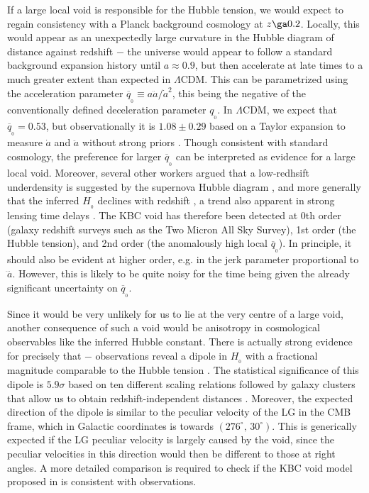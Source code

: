 \documentclass[fleqn,usenatbib,useAMS]{mnras} %
\begin{document}
If a large local void is responsible for the Hubble tension, we would expect to regain consistency with a Planck background cosmology at $z \ga 0.2$. Locally, this would appear as an unexpectedly large curvature in the Hubble diagram of distance against redshift $-$ the universe would appear to follow a standard background expansion history until $a \approx 0.9$, but then accelerate at late times to a much greater extent than expected in $\Lambda$CDM. This can be parametrized using the acceleration parameter $\overline{q}_{_0} \equiv a \ddot{a}/{\dot{a}}^2$, this being the negative of the conventionally defined deceleration parameter $q_{_0}$. In $\Lambda$CDM, we expect that $\overline{q}_{_0} = 0.53$, but observationally it is $1.08 \pm 0.29$ based on a Taylor expansion to measure $\dot{a}$ and $\ddot{a}$ without strong priors \citep{Camarena_2020a, Camarena_2020b}. Though consistent with standard cosmology, the preference for larger $\overline{q}_{_0}$ can be interpreted as evidence for a large local void. Moreover, several other workers argued that a low-redhsift underdensity is suggested by the supernova Hubble diagram \citep{Colgain_2019, Lukovic_2020, Kazantzidis_2020, Castello_2021, Kazantzidis_2021}, and more generally that the inferred $H_{_0}$ declines with redshift \citep[e.g.][]{Krishnan_2020, Krishnan_2021, Dainotti_2021}, a trend also apparent in strong lensing time delays \citep{Wong_2020}. The KBC void has therefore been detected at 0th order (galaxy redshift surveys such as the Two Micron All Sky Survey), 1st order (the Hubble tension), and 2nd order (the anomalously high local $\overline{q}_{_0}$). In principle, it should also be evident at higher order, e.g. in the jerk parameter proportional to $\dddot{a}$. However, this is likely to be quite noisy for the time being given the already significant uncertainty on $\overline{q}_{_0}$.

Since it would be very unlikely for us to lie at the very centre of a large void, another consequence of such a void would be anisotropy in cosmological observables like the inferred Hubble constant. There is actually strong evidence for precisely that $-$ observations reveal a dipole in $H_{_0}$ with a fractional magnitude comparable to the Hubble tension \citep{Migkas_2018}. The statistical significance of this dipole is $5.9\sigma$ based on ten different scaling relations followed by galaxy clusters that allow us to obtain redshift-independent distances \citep[table~3 of][]{Migkas_2021}. Moreover, the expected direction of the dipole is similar to the peculiar velocity of the LG in the CMB frame, which in Galactic coordinates is towards $\left(276^\circ, \, 30^\circ \right)$. This is generically expected if the LG peculiar velocity is largely caused by the void, since the peculiar velocities in this direction would then be different to those at right angles. A more detailed comparison is required to check if the KBC void model proposed in \citet{Haslbauer_2020} is consistent with observations.
\end{document}
